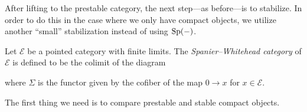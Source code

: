 After lifting to the prestable category, the next step---as before---is to stabilize. In order to do this in the case where we only have compact objects, we utilize another ``small'' stabilization instead of using $\mathrm{Sp}(-)$. 

\begin{definition}
    Let $\mathcal{E}$ be a pointed category with finite limits. The \emph{Spanier--Whitehead category} of $\mathcal{E}$ is defined to be the colimit of the diagram 
    \begin{center}
    \end{center}
    where $\Sigma$ is the functor given by the cofiber of the map $0\rightarrow x$ for $x\in \mathcal{E}$. 
\end{definition}

The first thing we need is to compare prestable and stable compact objects. 

